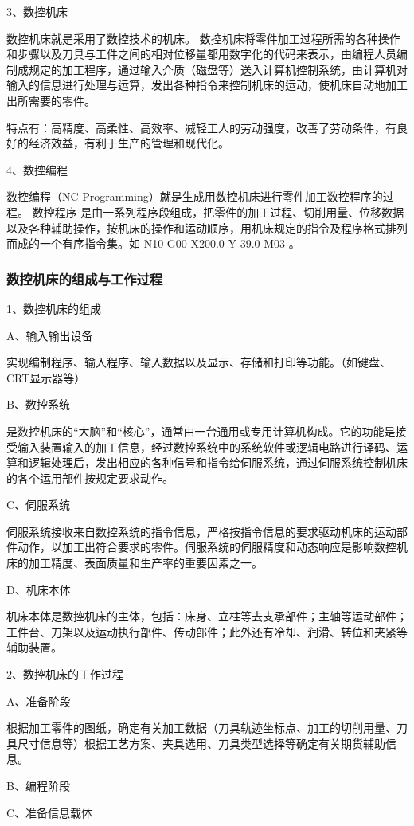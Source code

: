 3、数控机床

数控机床就是采用了数控技术的机床。
数控机床将零件加工过程所需的各种操作和步骤以及刀具与工件之间的相对位移量都用数字化的代码来表示，由编程人员编制成规定的加工程序，通过输入介质（磁盘等）送入计算机控制系统，由计算机对输入的信息进行处理与运算，发出各种指令来控制机床的运动，使机床自动地加工出所需要的零件。

特点有：高精度、高柔性、高效率、减轻工人的劳动强度，改善了劳动条件，有良好的经济效益，有利于生产的管理和现代化。

4、数控编程

数控编程（NC Programming）就是生成用数控机床进行零件加工数控程序的过程。
数控程序  是由一系列程序段组成，把零件的加工过程、切削用量、位移数据以及各种辅助操作，按机床的操作和运动顺序，用机床规定的指令及程序格式排列而成的一个有序指令集。如 N10 G00 X200.0 Y-39.0 M03 。

\subsubsection{数控机床的组成与工作过程}
1、数控机床的组成

A、输入输出设备

实现编制程序、输入程序、输入数据以及显示、存储和打印等功能。（如键盘、CRT显示器等）

B、数控系统

是数控机床的“大脑”和“核心”，通常由一台通用或专用计算机构成。它的功能是接受输入装置输入的加工信息，经过数控系统中的系统软件或逻辑电路进行译码、运算和逻辑处理后，发出相应的各种信号和指令给伺服系统，通过伺服系统控制机床的各个运用部件按规定要求动作。

C、伺服系统

伺服系统接收来自数控系统的指令信息，严格按指令信息的要求驱动机床的运动部件动作，以加工出符合要求的零件。伺服系统的伺服精度和动态响应是影响数控机床的加工精度、表面质量和生产率的重要因素之一。

D、机床本体

机床本体是数控机床的主体，包括：床身、立柱等去支承部件；主轴等运动部件；工件台、刀架以及运动执行部件、传动部件；此外还有冷却、润滑、转位和夹紧等辅助装置。

2、数控机床的工作过程

A、准备阶段

根据加工零件的图纸，确定有关加工数据（刀具轨迹坐标点、加工的切削用量、刀具尺寸信息等）根据工艺方案、夹具选用、刀具类型选择等确定有关期货辅助信息。

B、编程阶段

C、准备信息载体


